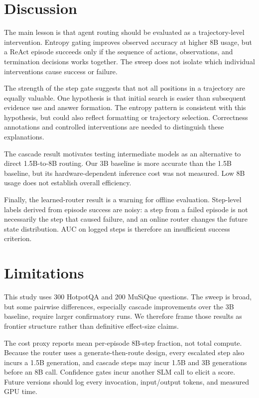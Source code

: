 \documentclass[sigplan,screen,review,anonymous,nonacm]{acmart}
\begin{document}
\section{Discussion}

The main lesson is that agent routing should be evaluated as a trajectory-level
intervention. Entropy gating improves observed accuracy at higher 8B usage, but a ReAct episode succeeds
only if the sequence of actions, observations, and termination decisions works
together. The sweep does not isolate which individual interventions cause success or failure.

The strength of the step gate suggests that not all positions in a trajectory
are equally valuable. One hypothesis is that initial search is easier than subsequent evidence use
and answer formation. The entropy pattern is consistent with this hypothesis,
but could also reflect formatting or trajectory selection. Correctness
annotations and controlled interventions are needed to distinguish these explanations.

The cascade result motivates testing intermediate models as an alternative
to direct 1.5B-to-8B routing. Our 3B baseline is more accurate than the
1.5B baseline, but its hardware-dependent
inference cost was not measured. Low 8B usage does not establish overall efficiency.

Finally, the learned-router result is a warning for offline evaluation.
Step-level labels derived from episode success are noisy: a step from a failed
episode is not necessarily the step that caused failure, and an online router
changes the future state distribution. AUC on logged steps is therefore an
insufficient success criterion.

\section{Limitations}

This study uses 300 HotpotQA and 200 MuSiQue questions. The sweep is broad,
but some pairwise differences, especially cascade improvements over the 3B
baseline, require larger confirmatory runs. We therefore frame those results
as frontier structure rather than definitive effect-size claims.

The cost proxy reports mean per-episode 8B-step fraction, not total compute. Because the router
uses a generate-then-route design, every escalated step also incurs a 1.5B
generation, and cascade steps may incur 1.5B and 3B generations before an 8B
call. Confidence gates incur another SLM call to elicit a score. Future versions
should log every invocation, input/output tokens, and measured GPU time.
\end{document}
